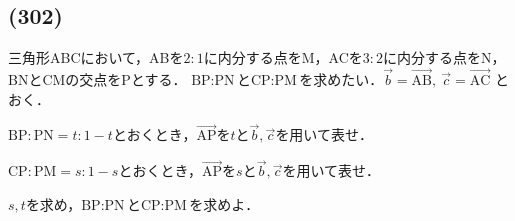 \documentclass[dvipdfmx,uplatex,b5paper]{jsarticle}
\newcommand{\Vector}[1]{\overrightarrow{\text{#1}}}
\begin{document}
\subsection*{(302)}
三角形ABCにおいて，ABを$2:1$に内分する点をM，ACを$3:2$に内分する点をN，BNとCMの交点をPとする．
$\text{BP}:\text{PN}$と$\text{CP}:\text{PM}$を求めたい．$\overrightarrow{b}=\Vector{AB},\ \overrightarrow{c}=\Vector{AC}$
とおく．
\begin{enumarabicp}
  \item $\text{BP}:\text{PN}=t:1-t$とおくとき，$\Vector{AP}$を$t$と$\overrightarrow{b},
  \overrightarrow{c}$を用いて表せ．
  \item $\text{CP}:\text{PM}=s:1-s$とおくとき，$\Vector{AP}$を$s$と$\overrightarrow{b},
  \overrightarrow{c}$を用いて表せ．
  \item $s,t$を求め，$\text{BP}:\text{PN}$と$\text{CP}:\text{PM}$を求めよ．
\end{enumarabicp}
\end{document}
